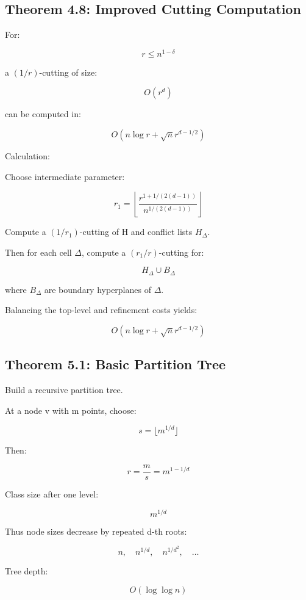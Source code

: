 \documentclass[
  11pt,
]{article}
\begin{document}
\hypertarget{theorem-4.8-improved-cutting-computation}{%
\subsection{Theorem 4.8: Improved Cutting
Computation}\label{theorem-4.8-improved-cutting-computation}}

For:

\[
r\le n^{1-\delta}
\]

a \((1/r)\)-cutting of size:

\[
O(r^d)
\]

can be computed in:

\[
O(n\log r+\sqrt{n}r^{d-1/2})
\]

Calculation:

Choose intermediate parameter:

\[
r_1= \left\lfloor \frac{r^{1+1/(2(d-1))}}{n^{1/(2(d-1))}} \right\rfloor
\]

Compute a \((1/r_1)\)-cutting of H and conflict lists \(H_\Delta\).

Then for each cell \(\Delta\), compute a \((r_1/r)\)-cutting for:

\[
H_\Delta\cup B_\Delta
\]

where \(B_\Delta\) are boundary hyperplanes of \(\Delta\).

Balancing the top-level and refinement costs yields:

\[
O(n\log r+\sqrt{n}r^{d-1/2})
\]

\hypertarget{theorem-5.1-basic-partition-tree}{%
\subsection{Theorem 5.1: Basic Partition
Tree}\label{theorem-5.1-basic-partition-tree}}

Build a recursive partition tree.

At a node v with m points, choose:

\[
s=\lfloor m^{1/d}\rfloor
\]

Then:

\[
r=\frac{m}{s}=m^{1-1/d}
\]

Class size after one level:

\[
m^{1/d}
\]

Thus node sizes decrease by repeated d-th roots:

\[
n,\quad n^{1/d},\quad n^{1/d^2},\quad\ldots
\]

Tree depth:

\[
O(\log\log n)
\]
\end{document}
